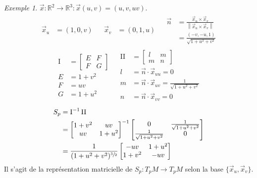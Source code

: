\documentclass{report}
\theoremstyle{definition}
\theoremstyle{remark}
\newtheorem*{exem}{Exemple}
\def\RR{\mathbb{R}}
\def\pff{\operatorname{I}}
\def\dff{\operatorname{II}}
\newcommand*{\norme}[1]{\left\|#1\right\|}
\begin{document}
	\begin{exem}
		$\vec x : \RR^2\to\RR^3 : \vec x(u,v)=(u,v,uv)$.
		\begin{align*}
			\begin{split}
				\vec x_u&= (1,0,v)
			\end{split}
			&
			\begin{split}
				\vec x_v&= (0,1,u)
			\end{split}
			&
			\begin{split}
				\vec n&= \frac{\vec x_u\times\vec x_v}{\norme{\vec x_u\times\vec x_v}}\\
				&= \frac{(-v,-u,1)}{\sqrt{1+u^2+v^2}}
			\end{split}
		\end{align*}
		\begin{align*}
			\begin{split}
				\pff&= \begin{bmatrix}
					E&F\\F&G
				\end{bmatrix}\\
				E&= 1+v^2\\
				F&= uv\\
				G&= 1+u^2
			\end{split}
			&
			\begin{split}
				\dff&= \begin{bmatrix}
					l&m\\m&n
				\end{bmatrix}\\
				l&= \vec n\cdot\vec x_{uu}=0\\
				m&= \vec n\cdot\vec x_{uv}=\frac{1}{\sqrt{1+u^2+v^2}}\\
				n&= \vec n\cdot\vec x_{vv}=0
			\end{split}
		\end{align*}
		\begin{align*}
			S_p&= \pff^{-1}\dff\\
			&= \begin{bmatrix}
				1+v^2&uv\\
				uv&1+u^2
			\end{bmatrix}^{-1} \begin{bmatrix}
				0&\frac{1}{\sqrt{1+u^2+v^2}}\\
				\frac{1}{\sqrt{1+u^2+v^2}}&0
			\end{bmatrix}\\
			&= \frac{1}{(1+u^2+v^2)^{\sfrac{3}{2}}} \begin{bmatrix}
				-uv&1+u^2\\
				1+v^2&-uv
			\end{bmatrix}
		\end{align*}
		Il s'agit de la repr\'esentation matricielle de $S_p:T_pM\to T_pM$ selon la base $\{\vec x_u,\vec x_v\}$.


\end{exem}
\end{document}
